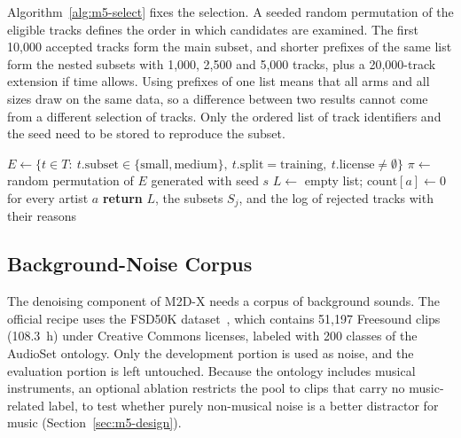 \documentclass{FastFyp}
\begin{document}
Algorithm~\ref{alg:m5-select} fixes the selection. A seeded random permutation of the eligible tracks defines the order in which candidates are examined. The first 10,000 accepted tracks form the main subset, and shorter prefixes of the same list form the nested subsets with 1,000, 2,500 and 5,000 tracks, plus a 20,000-track extension if time allows. Using prefixes of one list means that all arms and all sizes draw on the same data, so a difference between two results cannot come from a different selection of tracks. Only the ordered list of track identifiers and the seed need to be stored to reproduce the subset.

\begin{algorithm}[htbp]
\caption{Seeded, artist-capped selection of nested pre-training subsets}
\label{alg:m5-select}
$E\leftarrow\{t\in T:\ t.\mathrm{subset}\in\{\mathrm{small},\mathrm{medium}\},\ t.\mathrm{split}=\mathrm{training},\ t.\mathrm{license}\neq\emptyset\}$\;
$\pi\leftarrow$ random permutation of $E$ generated with seed $s$\;
$L\leftarrow$ empty list; $\mathrm{count}[a]\leftarrow 0$ for every artist $a$\;
\textbf{return} $L$, the subsets $S_j$, and the log of rejected tracks with their reasons\;
\end{algorithm}

\subsection{Background-Noise Corpus}
The denoising component of M2D-X needs a corpus of background sounds. The official recipe uses the FSD50K dataset~\cite{ref:Fonseca:2022fsd50k,ref:Niizumi:2024m2dx}, which contains 51,197 Freesound clips (108.3~h) under Creative Commons licenses, labeled with 200 classes of the AudioSet ontology. Only the development portion is used as noise, and the evaluation portion is left untouched. Because the ontology includes musical instruments, an optional ablation restricts the pool to clips that carry no music-related label, to test whether purely non-musical noise is a better distractor for music (Section~\ref{sec:m5-design}).
\end{document}
